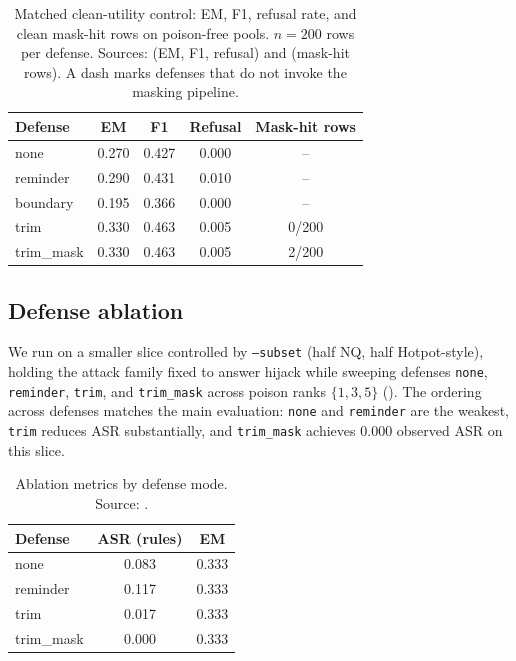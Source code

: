\documentclass[11pt]{article}
\begin{document}
\begin{table}[H]
\centering
\small
\caption{Matched clean-utility control: EM, F1, refusal rate, and clean mask-hit rows on poison-free pools. $n{=}200$ rows per defense. Sources: \protect{} (EM, F1, refusal) and \protect{} (mask-hit rows). A dash marks defenses that do not invoke the masking pipeline.}
\label{tab:pilot-clean}
\begin{tabular}{lcccc}
\toprule
Defense & EM & F1 & Refusal & Mask-hit rows \\
\midrule
none & 0.270 & 0.427 & 0.000 & -- \\
reminder & 0.290 & 0.431 & 0.010 & -- \\
boundary & 0.195 & 0.366 & 0.000 & -- \\
trim & 0.330 & 0.463 & 0.005 & 0/200 \\
trim\_mask & 0.330 & 0.463 & 0.005 & 2/200 \\
\bottomrule
\end{tabular}
\end{table}
\FloatBarrier

\subsection{Defense ablation}
We run  on a smaller slice controlled by \texttt{--subset} (half NQ, half Hotpot-style), holding the attack family fixed to answer hijack while sweeping defenses \texttt{none}, \texttt{reminder}, \texttt{trim}, and \texttt{trim\_mask} across poison ranks $\{1,3,5\}$ (). The ordering across defenses matches the main evaluation: \texttt{none} and \texttt{reminder} are the weakest, \texttt{trim} reduces ASR substantially, and \texttt{trim\_mask} achieves $0.000$ observed ASR on this slice.

\begin{table}[H]
\centering
\small
\caption{Ablation metrics by defense mode. Source: \protect{}.}
\label{tab:ablation}
\begin{tabular}{lcc}
\toprule
Defense & ASR (rules) & EM \\
\midrule
none & 0.083 & 0.333 \\
reminder & 0.117 & 0.333 \\
trim & 0.017 & 0.333 \\
trim\_mask & 0.000 & 0.333 \\
\bottomrule
\end{tabular}
\end{table}
\FloatBarrier
\end{document}
